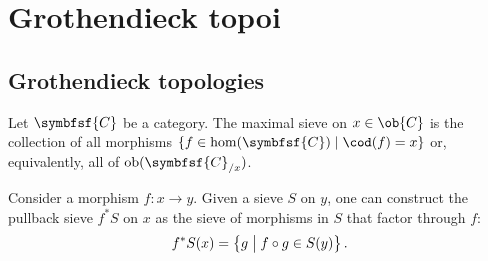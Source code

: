 \section{Grothendieck topoi}\label{section:grothendieck_topos}
\subsection{Grothendieck topologies}


    \begin{example}
        Let $\symbfsf{C}$ be a category. The maximal sieve on $x\in\ob{C}$ is the collection of all morphisms $\{f\in\mathrm{hom}(\symbfsf{C})\mid\cod(f)=x\}$ or, equivalently, all of $\mathrm{ob}(\symbfsf{C}_{/x})$.
    \end{example}
    \begin{example}
        Consider a morphism $f:x\rightarrow y$. Given a sieve $S$ on $y$, one can construct the pullback sieve $f^*S$ on $x$ as the sieve of morphisms in $S$ that factor through $f$:
        \begin{gather}
            f^*S(x) = \bigl\{g\bigm\vert f\circ g\in S(y)\bigr\}\,.
        \end{gather}
    \end{example}

